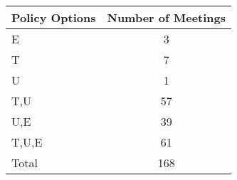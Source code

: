 \begin{tabular}{lc}
\hline\hline 
\addlinespace 
Policy Options & Number of Meetings \\ 
\hline 
E & 3 \\
T & 7 \\
U & 1 \\
T,U & 57 \\
U,E & 39 \\
T,U,E & 61 \\
\addlinespace 
Total & 168 \\
\hline 
\end{tabular}